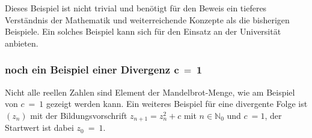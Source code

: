 \documentclass{book}
\begin{document}
Dieses Beispiel ist nicht trivial und benötigt für den Beweis ein
tieferes Verständnis der Mathematik und weiterreichende Konzepte als die
bisherigen Beispiele. Ein solches Beispiel kann sich für den Einsatz an
der Universität anbieten.

\hypertarget{noch-ein-beispiel-einer-divergenz-mathbfc-1}{%
\subsubsection{\texorpdfstring{noch ein Beispiel einer Divergenz
\(\mathbf{c\  = \ 1}\)}{noch ein Beispiel einer Divergenz \textbackslash mathbf\{c\textbackslash{}  = \textbackslash{} 1\}}}\label{noch-ein-beispiel-einer-divergenz-mathbfc-1}}

Nicht alle reellen Zahlen sind Element der Mandelbrot-Menge, wie am
Beispiel von \(c\  = \ 1\) gezeigt werden kann. Ein weiteres Beispiel
für eine divergente Folge ist \(\left( z_{n} \right)\) mit der
Bildungsvorschrift \(z_{n + 1} = z_{n}^{2} + c\) mit
\(n \in \mathbb{N}_{0}\) und \(c\  = 1\), der Startwert ist dabei
\(z_{0}\  = \ 1\).
\end{document}
